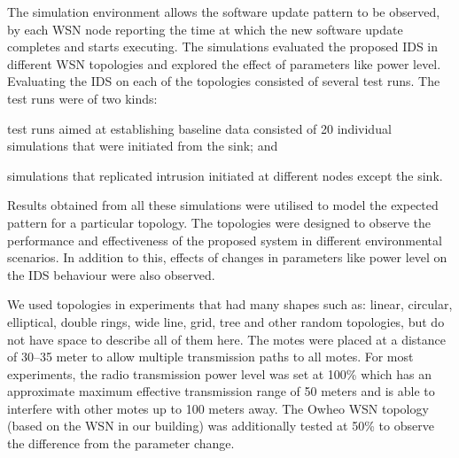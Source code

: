 \documentclass[conference,manuscript]{IEEEtran}
\newcommand{\notedme}[1]{\raisebox{0pt}[0pt][0pt]{\pdfcomment[open=true,color=blue]{#1}}}
\begin{document}

The simulation environment allows the software update pattern to be observed, by each WSN node reporting the time at which the new software update completes and starts executing.
The simulations evaluated the proposed IDS in different WSN topologies and explored the effect of parameters like power level.
Evaluating the IDS on each of the topologies consisted of several test runs.
The test runs were of two kinds: 
\begin{inparaenum}
\item test runs aimed at establishing baseline data consisted of 20 individual simulations that were initiated from the sink; and
\item simulations that replicated intrusion initiated at different nodes except the sink.
\end{inparaenum}
Results obtained from all these simulations were utilised to model the expected pattern for a particular topology.
%
The topologies were designed to observe the performance and effectiveness %
of the proposed system in different environmental scenarios. 
In addition to this, effects of changes in parameters like power level on the IDS behaviour were also observed.


We used topologies in experiments that had many shapes such as: linear, circular, elliptical, double rings, wide line, grid, tree and other random topologies, but do not have space to describe all of them here.
The motes were placed at a distance of 30--35 meter to allow  multiple transmission paths to all motes. %
For most experiments, the radio transmission power level was set at 100\% which has an approximate maximum effective transmission range of 50 meters and is able to interfere with other motes up to 100 meters away.
The Owheo WSN topology (based on the WSN in our building) was additionally tested at 50\%  to %
observe the difference from the parameter change.
\end{document}
